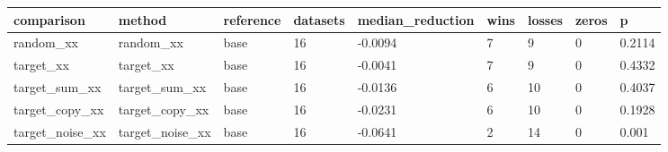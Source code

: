 \begin{tabular}{lllllllll}
\toprule
comparison & method & reference & datasets & median\_reduction & wins & losses & zeros & p \\
\midrule
random\_xx & random\_xx & base & 16 & -0.0094 & 7 & 9 & 0 & 0.2114 \\
target\_xx & target\_xx & base & 16 & -0.0041 & 7 & 9 & 0 & 0.4332 \\
target\_sum\_xx & target\_sum\_xx & base & 16 & -0.0136 & 6 & 10 & 0 & 0.4037 \\
target\_copy\_xx & target\_copy\_xx & base & 16 & -0.0231 & 6 & 10 & 0 & 0.1928 \\
target\_noise\_xx & target\_noise\_xx & base & 16 & -0.0641 & 2 & 14 & 0 & 0.001 \\
\bottomrule
\end{tabular}
